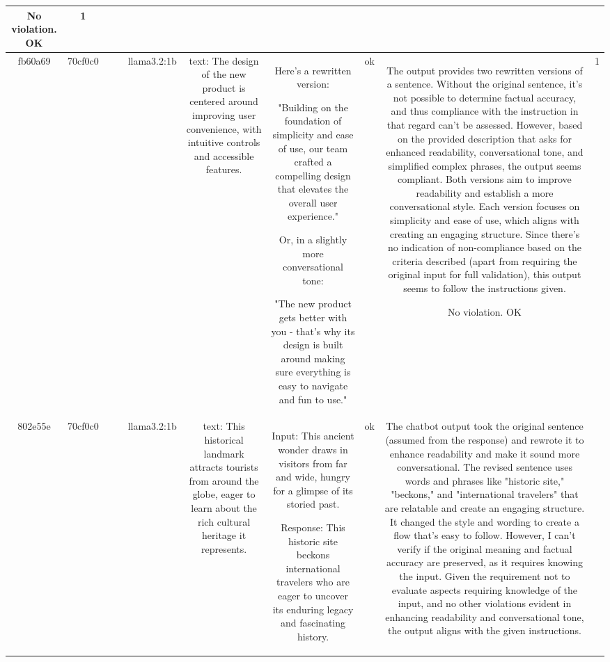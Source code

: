 \begin{table}[h!]
\begin{tabular}{|c|c|c|c|c|c|c|c|c|c|}
No violation.
OK & 1\\
\hline
fb60a69 & 70cf0c0 &  &  & llama3.2:1b & text: The design of the new product is centered around improving user convenience, with intuitive controls and accessible features. & Here's a rewritten version:

"Building on the foundation of simplicity and ease of use, our team crafted a compelling design that elevates the overall user experience."

Or, in a slightly more conversational tone:

"The new product gets better with you - that's why its design is built around making sure everything is easy to navigate and fun to use." & ok & The output provides two rewritten versions of a sentence. Without the original sentence, it's not possible to determine factual accuracy, and thus compliance with the instruction in that regard can't be assessed. However, based on the provided description that asks for enhanced readability, conversational tone, and simplified complex phrases, the output seems compliant. Both versions aim to improve readability and establish a more conversational style. Each version focuses on simplicity and ease of use, which aligns with creating an engaging structure. Since there's no indication of non-compliance based on the criteria described (apart from requiring the original input for full validation), this output seems to follow the instructions given.

No violation.
OK & 1\\
\hline
802e55e & 70cf0c0 &  &  & llama3.2:1b & text: This historical landmark attracts tourists from around the globe, eager to learn about the rich cultural heritage it represents. & Input: This ancient wonder draws in visitors from far and wide, hungry for a glimpse of its storied past.

Response: This historic site beckons international travelers who are eager to uncover its enduring legacy and fascinating history. & ok & The chatbot output took the original sentence (assumed from the response) and rewrote it to enhance readability and make it sound more conversational. The revised sentence uses words and phrases like "historic site," "beckons," and "international travelers" that are relatable and create an engaging structure. It changed the style and wording to create a flow that's easy to follow. However, I can't verify if the original meaning and factual accuracy are preserved, as it requires knowing the input. Given the requirement not to evaluate aspects requiring knowledge of the input, and no other violations evident in enhancing readability and conversational tone, the output aligns with the given instructions.


\end{tabular}
\end{table}

